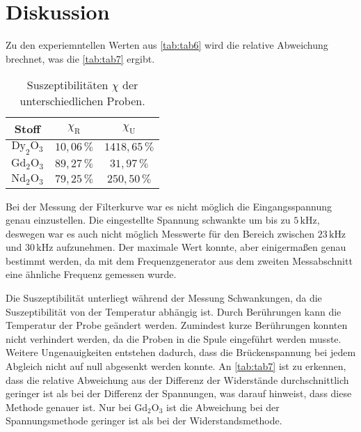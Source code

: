 \section{Diskussion}
\label{sec:Diskussion}

Zu den experiemntellen Werten aus \autoref{tab:tab6} wird die relative Abweichung brechnet, was die \autoref{tab:tab7} ergibt.

\begin{table}[H]
    \centering
    \caption{Suszeptibilitäten $\chi$ der unterschiedlichen Proben.}
    \label{tab:tab7}
    \begin{tabular}{S S S}
      \toprule
       {Stoff} & {$\chi_{\text{R}}$} & {$\chi_{\text{U}}$}  \\
      \midrule
      {$\text{Dy}_2\text{O}_3$}  &{$10,06 \, \%$}    &{$ 1418,65 \, \%$}\\
      {$\text{Gd}_2\text{O}_3$}  &{$89,27 \, \%$}    &{$ 31,97 \, \%$}\\
      {$\text{Nd}_2\text{O}_3$}  &{$79,25 \, \%$}    &{$ 250,50 \, \%$}\\
      \bottomrule
    \end{tabular}
\end{table}

Bei der Messung der Filterkurve war es nicht möglich die Eingangsspannung genau einzustellen. Die eingestellte Spannung schwankte um bis zu $ 5 \, \unit{\kilo\hertz}$, deswegen war es auch nicht möglich Messwerte für den Bereich zwischen $ 23 \, \unit{\kilo\hertz} $ und $ 30 \, \unit{\kilo\hertz} $  aufzunehmen.
Der maximale Wert konnte, aber einigermaßen genau bestimmt werden, da mit dem Frequenzgenerator aus dem zweiten Messabschnitt eine ähnliche Frequenz gemessen wurde.

Die Suszeptibilität unterliegt während der Messung Schwankungen, da die Suszeptibilität von der Temperatur abhängig ist. Durch Berührungen kann die Temperatur der Probe geändert werden. Zumindest kurze Berührungen konnten nicht verhindert werden, da die Proben in die Spule eingeführt werden musste.\\
Weitere Ungenauigkeiten entstehen  dadurch, dass die Brückenspannung bei jedem Abgleich nicht auf null abgesenkt werden konnte.
An \autoref{tab:tab7} ist zu erkennen, dass die relative Abweichung aus der Differenz der Widerstände durchschnittlich geringer ist als bei der Differenz der Spannungen, was darauf hinweist, dass diese Methode genauer ist.
Nur bei $\text{Gd}_2\text{O}_3$ ist die Abweichung bei der Spannungsmethode geringer ist als bei der Widerstandsmethode.
